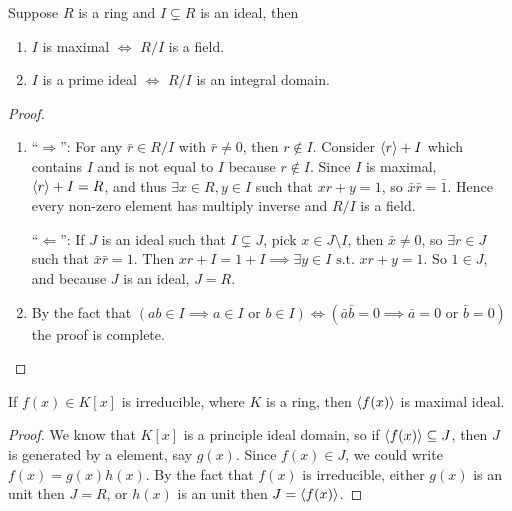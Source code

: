 \begin{prop} \label{prop:max-prime-to-field-int-domain}
  Suppose $R$ is a ring and $I \subsetneq R$ is an ideal, then
  \begin{enumerate}
    \item $I$ is maximal $\iff$ $R / I$ is a field.
    \item $I$ is a prime ideal $\iff$ $R / I$ is an integral domain.
  \end{enumerate}

  \begin{proof} \hfill
    \begin{enumerate}
      \item ``$\Rightarrow$'': For any $\bar{r} \in R/I$ with $\bar{r} \neq 0$, then $r \not\in I$.
        Consider $\langle r \rangle + I$ which contains $I$ and is not equal to $I$ because $r \not\in I$.
        Since $I$ is maximal, $\langle r \rangle + I = R$, and thus $\exists x \in R, y \in I$ such that
        $xr + y = 1$, so $\bar{x} \bar{r} = \bar{1}$. Hence every non-zero element has multiply inverse
        and $R / I$ is a field.

      ``$\Leftarrow$'': If $J$ is an ideal such that $I \subsetneq J$, pick $x \in J \setminus I$,
      then $\bar{x} \neq 0$, so $\exists r \in J$ such that $\bar{x} \bar{r} = 1$. Then
      $xr + I = 1 + I \implies \exists y \in I \text{ s.t. } xr + y = 1$. So $1 \in J$, and
      because $J$ is an ideal, $J = R$.

      \item By the fact that $(ab \in I \implies a \in I \text{ or } b \in I) \iff
        (\bar{a}\bar{b} = 0 \implies \bar{a} = 0 \text{ or } \bar{b} = 0)$ the proof is complete.
        \qedhere
    \end{enumerate}
  \end{proof}
\end{prop}

\begin{prop} \label{prop:irr-to-max-ideal}
  If $f(x) \in K[x]$ is irreducible, where $K$ is a ring, then $\langle f(x) \rangle$ is maximal ideal.
  \begin{proof}
    We know that $K[x]$ is a principle ideal domain, so if $\langle f(x) \rangle \subseteq J$, then
    $J$ is generated by a element, say $g(x)$. Since $f(x) \in J$, we could write $f(x) = g(x) h(x)$.
    By the fact that $f(x)$ is irreducible, either $g(x)$ is an unit then $J = R$, or $h(x)$ is
    an unit then $J = \langle f(x) \rangle$.
  \end{proof}
\end{prop}

